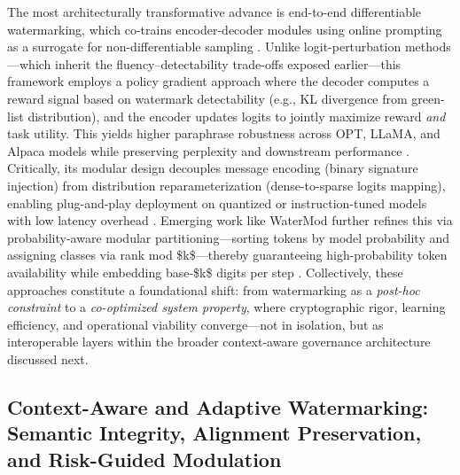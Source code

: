 \documentclass[11pt,a4paper]{article}
\begin{document}
The most architecturally transformative advance is end-to-end differentiable watermarking, which co-trains encoder-decoder modules using online prompting as a surrogate for non-differentiable sampling \cite{arxiv:2403.10553}. Unlike logit-perturbation methods---which inherit the fluency--detectability trade-offs exposed earlier---this framework employs a policy gradient approach where the decoder computes a reward signal based on watermark detectability (e.g., KL divergence from green-list distribution), and the encoder updates logits to jointly maximize reward \emph{and} task utility. This yields higher paraphrase robustness across OPT, LLaMA, and Alpaca models while preserving perplexity and downstream performance \cite{arxiv:2403.10553}. Critically, its modular design decouples message encoding (binary signature injection) from distribution reparameterization (dense-to-sparse logits mapping), enabling plug-and-play deployment on quantized or instruction-tuned models with low latency overhead \cite{arxiv:2403.10553}. Emerging work like WaterMod further refines this via probability-aware modular partitioning---sorting tokens by model probability and assigning classes via rank mod \$k\$---thereby guaranteeing high-probability token availability while embedding base-\$k\$ digits per step \cite{arxiv:2511.07863}. Collectively, these approaches constitute a foundational shift: from watermarking as a \emph{post-hoc constraint} to a \emph{co-optimized system property}, where cryptographic rigor, learning efficiency, and operational viability converge---not in isolation, but as interoperable layers within the broader context-aware governance architecture discussed next.


\subsection{Context-Aware and Adaptive Watermarking: Semantic Integrity, Alignment Preservation, and Risk-Guided Modulation}
\end{document}
